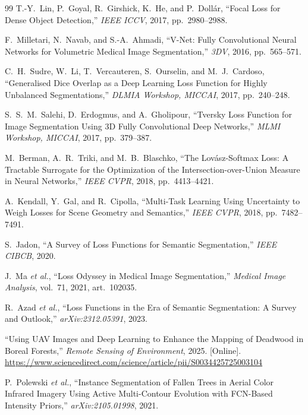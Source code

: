 \begin{thebibliography}{99}
T.-Y.~Lin, P.~Goyal, R.~Girshick, K.~He, and P.~Doll\'ar,
``Focal Loss for Dense Object Detection,''
\textit{IEEE ICCV}, 2017, pp.~2980--2988.

F.~Milletari, N.~Navab, and S.-A.~Ahmadi,
``V-Net: Fully Convolutional Neural Networks for Volumetric Medical Image
Segmentation,''
\textit{3DV}, 2016, pp.~565--571.

C.~H.~Sudre, W.~Li, T.~Vercauteren, S.~Ourselin, and M.~J.~Cardoso,
``Generalised Dice Overlap as a Deep Learning Loss Function for Highly Unbalanced
Segmentations,''
\textit{DLMIA Workshop, MICCAI}, 2017, pp.~240--248.

S.~S.~M.~Salehi, D.~Erdogmus, and A.~Gholipour,
``Tversky Loss Function for Image Segmentation Using 3D Fully Convolutional Deep
Networks,'' \textit{MLMI Workshop, MICCAI}, 2017, pp.~379--387.

M.~Berman, A.~R.~Triki, and M.~B.~Blaschko,
``The Lovász-Softmax Loss: A Tractable Surrogate for the Optimization of the
Intersection-over-Union Measure in Neural Networks,''
\textit{IEEE CVPR}, 2018, pp.~4413--4421.

A.~Kendall, Y.~Gal, and R.~Cipolla,
``Multi-Task Learning Using Uncertainty to Weigh Losses for Scene Geometry and
Semantics,''
\textit{IEEE CVPR}, 2018, pp.~7482--7491.

S.~Jadon,
``A Survey of Loss Functions for Semantic Segmentation,''
\textit{IEEE CIBCB}, 2020.

J.~Ma \textit{et al.},
``Loss Odyssey in Medical Image Segmentation,''
\textit{Medical Image Analysis}, vol.~71, 2021, art.~102035.

R.~Azad \textit{et al.},
``Loss Functions in the Era of Semantic Segmentation: A Survey and Outlook,''
\textit{arXiv:2312.05391}, 2023.

``Using UAV Images and Deep Learning to Enhance the Mapping of Deadwood in Boreal
Forests,'' \textit{Remote Sensing of Environment}, 2025.
[Online]. \url{https://www.sciencedirect.com/science/article/pii/S0034425725003104}

P.~Polewski \textit{et al.},
``Instance Segmentation of Fallen Trees in Aerial Color Infrared Imagery Using Active
Multi-Contour Evolution with FCN-Based Intensity Priors,''
\textit{arXiv:2105.01998}, 2021.


\end{thebibliography}
